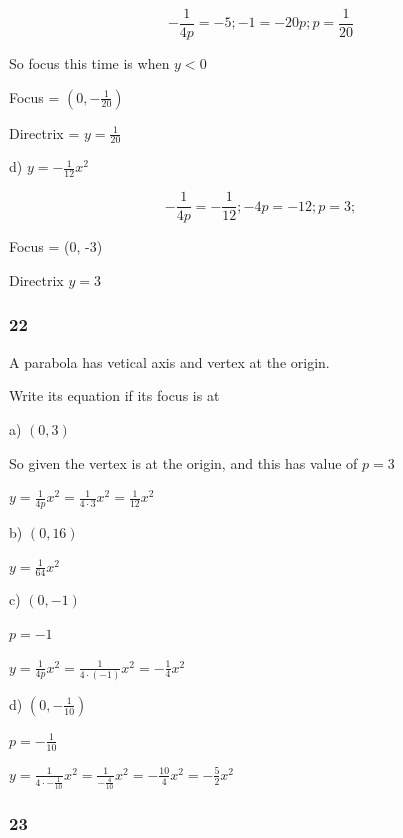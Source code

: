 \documentclass[]{report}
\begin{document}

\[
-\frac{1}{4p} = -5; -1 = -20p; p=\frac{1}{20}
\]

So focus this time is when $y < 0$

Focus = $(0, -\frac{1}{20})$

Directrix = $y = \frac{1}{20}$

d) $y = -\frac{1}{12}x^2$


\[
-\frac{1}{4p} = -\frac{1}{12}; -4p = -12; p = 3;
\]

Focus = (0, -3)

Directrix $y = 3$

\subsubsection{22}

A parabola has vetical axis and vertex at the origin.

Write its equation if its focus is at 

a) $(0, 3)$

So given the vertex is at the origin, and this has value of $p = 3$

$ y = \frac{1}{4p}x^2 = \frac{1}{4\cdot3}x^2 = \frac{1}{12}x^2$

b) $(0, 16)$

$y = \frac{1}{64}x^2$

c) $(0, -1)$

$ p = -1$

$ y = \frac{1}{4p}x^2 = \frac{1}{4\cdot (-1)} x^2 = -\frac{1}{4}x^2$

d) $(0, -\frac{1}{10})$

$p = -\frac{1}{10}$

$y = \frac{1}{4 \cdot -\frac{1}{10}}x^2 = \frac{1}{-\frac{4}{10}}x^2 = -\frac{10}{4}x^2 = -\frac{5}{2}x^2$


\subsubsection{23}
\end{document}
